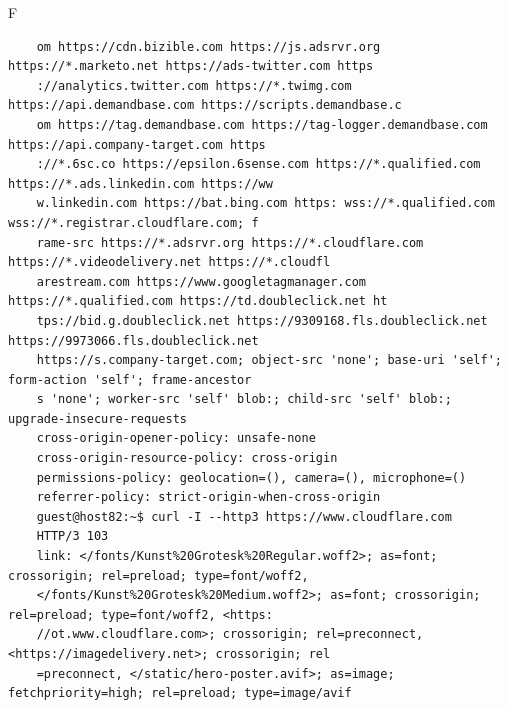 \begin{maintask}{F}
\begin{termout}[H]
\begin{verbatim}
    om https://cdn.bizible.com https://js.adsrvr.org https://*.marketo.net https://ads-twitter.com https
    ://analytics.twitter.com https://*.twimg.com https://api.demandbase.com https://scripts.demandbase.c
    om https://tag.demandbase.com https://tag-logger.demandbase.com https://api.company-target.com https
    ://*.6sc.co https://epsilon.6sense.com https://*.qualified.com https://*.ads.linkedin.com https://ww
    w.linkedin.com https://bat.bing.com https: wss://*.qualified.com wss://*.registrar.cloudflare.com; f
    rame-src https://*.adsrvr.org https://*.cloudflare.com https://*.videodelivery.net https://*.cloudfl
    arestream.com https://www.googletagmanager.com https://*.qualified.com https://td.doubleclick.net ht
    tps://bid.g.doubleclick.net https://9309168.fls.doubleclick.net https://9973066.fls.doubleclick.net 
    https://s.company-target.com; object-src 'none'; base-uri 'self'; form-action 'self'; frame-ancestor
    s 'none'; worker-src 'self' blob:; child-src 'self' blob:; upgrade-insecure-requests                
    cross-origin-opener-policy: unsafe-none                                                             
    cross-origin-resource-policy: cross-origin                                                          
    permissions-policy: geolocation=(), camera=(), microphone=()                                        
    referrer-policy: strict-origin-when-cross-origin                                                    
    guest@host82:~$ curl -I --http3 https://www.cloudflare.com 
    HTTP/3 103 
    link: </fonts/Kunst%20Grotesk%20Regular.woff2>; as=font; crossorigin; rel=preload; type=font/woff2, 
    </fonts/Kunst%20Grotesk%20Medium.woff2>; as=font; crossorigin; rel=preload; type=font/woff2, <https:
    //ot.www.cloudflare.com>; crossorigin; rel=preconnect, <https://imagedelivery.net>; crossorigin; rel
    =preconnect, </static/hero-poster.avif>; as=image; fetchpriority=high; rel=preload; type=image/avif


\end{verbatim}
\end{termout}
\end{maintask}
